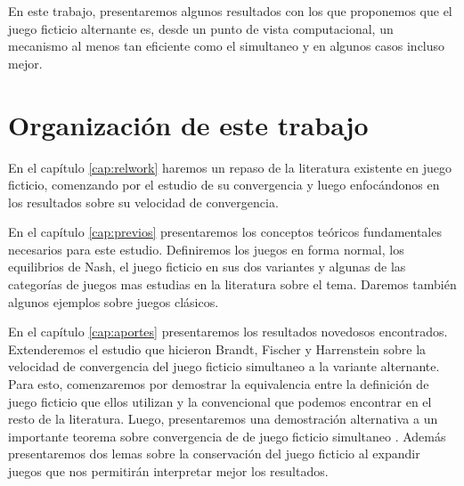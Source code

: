 En este trabajo, presentaremos algunos resultados con los que proponemos que el juego ficticio alternante es, desde un punto de vista computacional, un mecanismo al menos tan eficiente como el simultaneo y en algunos casos incluso mejor. 


\section{Organización de este trabajo}

 En el capítulo \ref{cap:relwork} haremos un repaso de la literatura existente en juego ficticio, comenzando por el estudio de su convergencia y luego enfocándonos en los resultados sobre su velocidad de convergencia. 
 
 En el capítulo \ref{cap:previos} presentaremos los conceptos teóricos fundamentales necesarios para este estudio. Definiremos los juegos en forma normal, los equilibrios de Nash, el juego ficticio en sus dos variantes y algunas de las categorías de juegos mas estudias en la literatura sobre el tema. Daremos también algunos ejemplos sobre juegos clásicos.

 En el capítulo \ref{cap:aportes} presentaremos los resultados novedosos encontrados. Extenderemos el estudio que hicieron Brandt, Fischer y Harrenstein \cite{brandt:rate:convergence} sobre la velocidad de convergencia del juego ficticio simultaneo a la variante alternante. Para esto, comenzaremos por demostrar la equivalencia entre la definición de juego ficticio que ellos utilizan y la convencional que podemos encontrar en el resto de la literatura. Luego, presentaremos una demostración alternativa a un importante teorema sobre convergencia de de juego ficticio simultaneo . Además presentaremos dos lemas sobre la conservación del juego ficticio al expandir juegos que nos permitirán interpretar mejor los resultados.